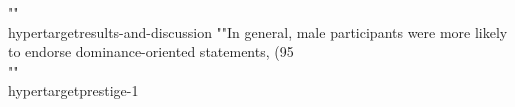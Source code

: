 {{{{{{{{{{{{{{{{{{{{{""\\hypertarget{results-and-discussion}{%
""In general, male participants were more likely to endorse dominance-oriented statements, (95\\%
""\\hypertarget{prestige-1}{%
}}}}}}}}}}}}}}}}}}}}}}}
